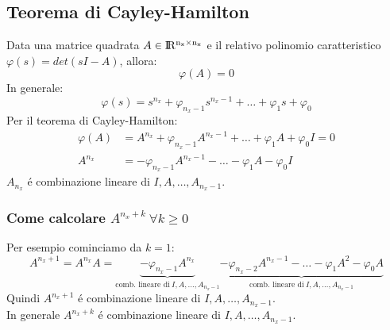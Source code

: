 \documentclass[../main.tex]{subfiles}
\begin{document}
	\subsection{Teorema di Cayley-Hamilton}
		Data una matrice quadrata $ A \in \rm I\!R^{n_x \times n_x} $ e il relativo polinomio caratteristico $ \varphi(s) = det(sI-A) $, allora:
		\[ \varphi(A) = 0 \]
		In generale:
		\[ \varphi(s) = s^{n_x} + \varphi_{n_x-1} s^{n_x-1} + \dots + \varphi_1 s + \varphi_0 \]
		Per il teorema di Cayley-Hamilton:
		\begin{align}
			\label{th_ch}
			\varphi(A) &= A^{n_x} + \varphi_{n_x-1} A^{n_x-1} + \dots + \varphi_1 A + \varphi_0 I = 0\\
			A^{n_x} &= -\varphi_{n_x-1} A^{n_x-1} - \dots - \varphi_1 A - \varphi_0 I
		\end{align}
		$ A_{n_x} $ \'e combinazione lineare di $ I, A, \dots, A_{n_x-1} $.
		
	\subsubsection{Come calcolare $ A^{n_x+k}\ \forall k \geq 0 $}
		Per esempio cominciamo da $ k = 1 $:
		\[
			A^{n_x+1} = A^{n_x} A = \underbrace{- \varphi_{n_x-1} A^{n_x}}_{\text{comb. lineare di}\ I, A, \dots, A_{n_x-1}} \underbrace{- \varphi_{n_x-2} A^{n_x-1} - \dots - \varphi_1 A^2 - \varphi_0 A}_{\text{comb. lineare di}\ I, A, \dots, A_{n_x-1}}
		\]
		Quindi $ A^{n_x+1} $ \'e combinazione lineare di $ I, A, \dots, A_{n_x-1} $.\\
		In generale $ A^{n_x+k} $ \'e combinazione lineare di $ I, A, \dots, A_{n_x-1} $.
		
\end{document}

